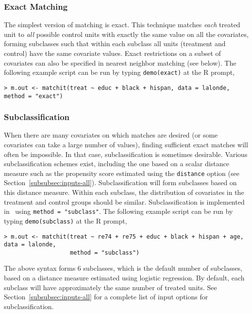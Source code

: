\subsubsection{Exact Matching}
\label{subsubsec:exact}

The simplest version of matching is exact.  This technique matches
\emph{each} treated unit to \emph{all} possible control units with
exactly the same value on all the covariates, forming subclasses such
that within each subclass all units (treatment and control) have the
same covariate values.  Exact restrictions on a subset of covariates
can also be specified in nearest neighbor matching (see below).  The following example script can be
run by typing {\tt demo(exact)} at the R prompt,
\begin{verbatim}
> m.out <- matchit(treat ~ educ + black + hispan, data = lalonde, method = "exact")
\end{verbatim}

\subsubsection{Subclassification}
\label{subsubsec:subclass}

When there are many covariates on which matches are desired (or some
covariates can take a large number of values), finding sufficient
exact matches will often be impossible.  In that case,
subclassification is sometimes desirable. Various subclassification
schemes exist, including the one based on a scalar distance measure
such as the propensity score estimated using the \texttt{distance}
option (see Section~\ref{subsubsec:inputs-all}).  Subclassification
will form subclasses based on this distance measure.  Within each
subclass, the distribution of covariates in the treatment and control
groups should be similar.  Subclassification is implemented in
\MatchIt\ using \texttt{method = "subclass"}.
The following example script can be run by typing {\tt demo(subclass)}
at the R prompt,
\begin{verbatim}
> m.out <- matchit(treat ~ re74 + re75 + educ + black + hispan + age, data = lalonde, 
                   method = "subclass")
\end{verbatim}
The above syntax forms 6 subclasses, which is the default number
of subclasses, based on a distance measure estimated using logistic
regression.  By default, each subclass will have approximately the
same number of treated units.  See
Section~\ref{subsubsec:inputs-all}
for a complete list of input options for subclassification.

